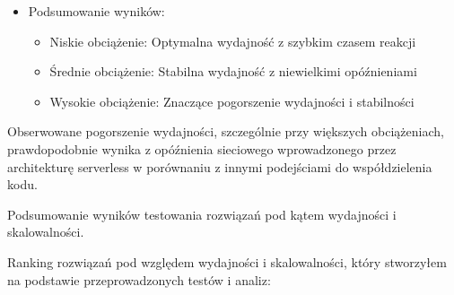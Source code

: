 \documentclass[runningheads,12pt]{llncs}
\begin{document}
\begin{itemize}
  \item Podsumowanie wyników:
  \begin{itemize}
    \item Niskie obciążenie: Optymalna wydajność z szybkim czasem reakcji
    \item Średnie obciążenie: Stabilna wydajność z niewielkimi opóźnieniami
    \item Wysokie obciążenie: Znaczące pogorszenie wydajności i stabilności
  \end{itemize}
\end{itemize}

Obserwowane pogorszenie wydajności, szczególnie przy większych obciążeniach, prawdopodobnie wynika z opóźnienia sieciowego wprowadzonego przez architekturę serverless w porównaniu z innymi podejściami do współdzielenia kodu.

\newpage


Podsumowanie wyników testowania rozwiązań pod kątem wydajności i skalowalności.

Ranking rozwiązań pod względem wydajności i skalowalności, który stworzyłem na podstawie przeprowadzonych testów i analiz:
\end{document}
